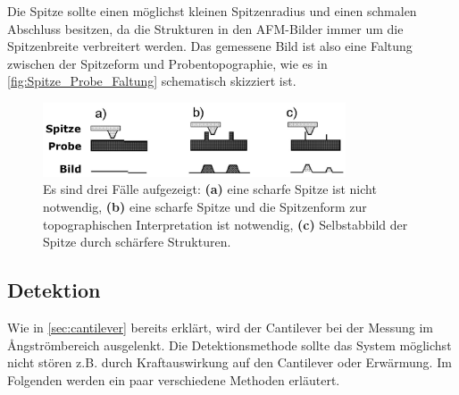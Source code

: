     Die Spitze sollte einen möglichst kleinen Spitzenradius und einen schmalen Abschluss besitzen, da die Strukturen in den AFM-Bilder immer um die Spitzenbreite verbreitert werden.
    Das gemessene Bild ist also eine Faltung zwischen der Spitzeform und Probentopographie, wie es in \autoref{fig:Spitze_Probe_Faltung} schematisch skizziert ist.
    \begin{figure}[ht]
        \centering\captionsetup{format=plain}
        \includegraphics[width=0.8\textwidth]{bilder/Spitze_Probe_Faltung.png}
        \caption{Es sind drei Fälle aufgezeigt: \textbf{(a)} eine scharfe Spitze ist nicht notwendig, \textbf{(b)} eine scharfe Spitze und die Spitzenform zur topographischen Interpretation ist notwendig, \textbf{(c)} Selbstabbild der Spitze durch schärfere Strukturen. \cite{AFM_image_artifacts}}
        \label{fig:Spitze_Probe_Faltung}
    \end{figure}

\subsection{Detektion}
\label{sec:detektion}
    Wie in \autoref{sec:cantilever} bereits erklärt, wird der Cantilever bei der Messung im \r{A}ngströmbereich ausgelenkt.
    Die Detektionsmethode sollte das System möglichst nicht stören z.B. durch Kraftauswirkung auf den Cantilever oder Erwärmung.
    Im Folgenden werden ein paar verschiedene Methoden erläutert.

